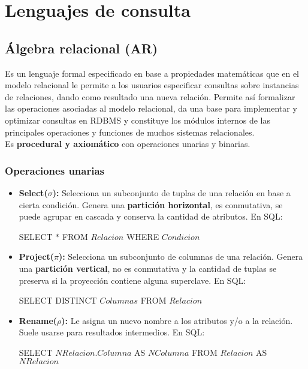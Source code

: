 \section*{Lenguajes de consulta}
\subsection*{Álgebra relacional (AR)}
Es un lenguaje formal especificado en base a propiedades matemáticas que en el modelo relacional le permite a los usuarios especificar consultas sobre instancias de relaciones, dando como resultado una nueva relación. Permite así formalizar las operaciones asociadas al modelo relacional, da una base para implementar y optimizar consultas en RDBMS y constituye los módulos internos de las principales operaciones y funciones de muchos sistemas relacionales. \\
Es \textbf{procedural y axiomático} con operaciones unarias y binarias.

\subsubsection*{Operaciones unarias}
\begin{itemize}
    \item \textbf{Select($\sigma$):} Selecciona un subconjunto de tuplas de una relación en base a cierta condición. Genera una \textbf{partición horizontal}, es conmutativa, se puede agrupar en cascada y conserva la cantidad de atributos. En SQL:
    \begin{SQL}
        SELECT $*$ FROM $Relacion$ WHERE $Condicion$
    \end{SQL}
    \item \textbf{Project($\pi$):} Selecciona un subconjunto de columnas de una relación. Genera una \textbf{partición vertical}, no es conmutativa y la cantidad de tuplas se preserva si la proyección contiene alguna superclave. En SQL:
    \begin{SQL}
        SELECT DISTINCT $Columnas$ FROM $Relacion$
    \end{SQL}
    \item \textbf{Rename($\rho$):} Le asigna un nuevo nombre a los atributos y/o a la relación. Suele usarse para resultados intermedios. En SQL:
    \begin{SQL}
        SELECT $NRelacion.Columna$ AS $NColumna$ FROM $Relacion$ AS $NRelacion$
    \end{SQL}
\end{itemize}

